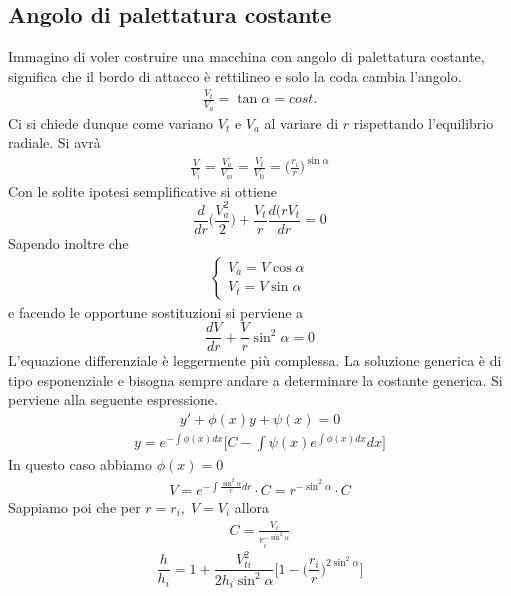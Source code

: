 \subsection{Angolo di palettatura costante}
Immagino di voler costruire una macchina con angolo di palettatura costante, significa che il bordo di attacco è rettilineo e solo la coda cambia l'angolo.
\begin{align*}
\frac{V_t}{V_a} = \tan \alpha = cost.
\end{align*}
Ci si chiede dunque come variano $V_t$ e $V_a$ al variare di $r$ rispettando l'equilibrio radiale.
Si avrà
\begin{align*}
\frac{V}{V_i} = \frac{V_a}{V_{ai}} = \frac{V_t}{V_{ti}} = \bigg(\frac{r_i}{r} \bigg)^{\sin \alpha}
\end{align*}
Con le solite ipotesi semplificative si ottiene
\begin{equation}
\frac{d}{dr} \bigg(\frac{V_a^2}{2} \bigg) + \frac{V_t}{r} \frac{d(rV_t}{dr} = 0
\end{equation}
Sapendo inoltre che
\begin{align*}
\begin{cases}
V_a = V \cos \alpha\\
V_t = V \sin \alpha
\end{cases}
\end{align*}
e facendo le opportune sostituzioni si perviene a
\begin{equation}
\boxed{\frac{dV}{dr} + \frac{V}{r} \sin^2 \alpha = 0}
\end{equation}
L'equazione differenziale è leggermente più complessa. La soluzione generica è di tipo esponenziale e bisogna sempre andare a determinare la costante generica. Si perviene alla seguente espressione.
\begin{align*}
y' + \phi(x)y + \psi(x) = 0 
\end{align*}
\begin{align*}
y = e^{-\int \phi(x)dx} \bigg[ C- \int \psi(x) e^{\int \phi(x)dx} dx \bigg] 
\end{align*}
In questo caso abbiamo $\phi(x) = 0$
\begin{align*}
V = e^{-\int \frac{\sin^2 \alpha}{r}dr}\cdot C = r^{-\sin^2 \alpha} \cdot C
\end{align*}
Sappiamo poi che per $r=r_i,\; V=V_i$ allora
\begin{align*}
C = \frac{V_i}{r_i^{-\sin^2 \alpha}}
\end{align*}
\begin{equation}
\boxed{ \frac{h}{h_i} =  1+ \frac{V_{ti}^2}{2 h_i \sin^2 \alpha} \bigg[1- \bigg(\frac{r_i}{r} \bigg) ^{2 \sin^2 \alpha} \bigg]}
\end{equation}
